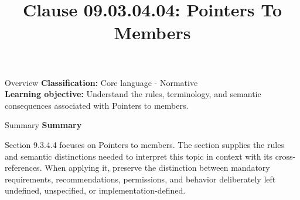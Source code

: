 \documentclass[10pt,letterpaper]{article}
\title{Clause 09.03.04.04: Pointers To Members}
\author{}
\date{}
\begin{document}
\maketitle
\begin{CornellOverviewBox}{Overview}
\textbf{Classification:} Core language - Normative\\[2pt]
\textbf{Learning objective:} Understand the rules, terminology, and semantic consequences associated with Pointers to members.
\end{CornellOverviewBox}\begin{CornellSummaryBox}{Summary}
{\sffamily\bfseries\color{Accent} Summary}\par\vspace{3pt}Section 9.3.4.4 focuses on Pointers to members. The section supplies the rules and semantic distinctions needed to interpret this topic in context with its cross-references. When applying it, preserve the distinction between mandatory requirements, recommendations, permissions, and behavior deliberately left undefined, unspecified, or implementation-defined.
\end{CornellSummaryBox}
\end{document}
